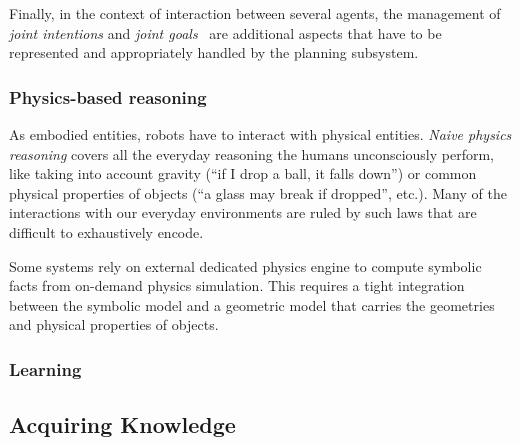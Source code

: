 Finally, in the context of interaction between several agents, the management
of \emph{joint intentions} and \emph{joint goals}~\cite{Tomasello2005,
Dominey2011} are additional aspects that have to be represented and
appropriately handled by the planning subsystem.


\subsubsection{Physics-based reasoning}
\label{sect|physics}

As embodied entities, robots have to interact with physical entities.
\emph{Naive physics reasoning} covers all the everyday reasoning the humans
unconsciously perform, like taking into account gravity (``if I drop a ball, it
falls down'') or common physical properties of objects (``a glass may break if
dropped'', etc.). Many of the interactions with our everyday environments are
ruled by such laws that are difficult to exhaustively encode.

Some systems \cite{Kunze2011a} rely on external dedicated physics engine to
compute symbolic facts from on-demand physics simulation. This requires a tight
integration between the symbolic model and a geometric model that carries the
geometries and physical properties of objects.

\subsubsection{Learning}
\label{sect|learning}


\subsection{Acquiring Knowledge}

\begin{scriptsize}
\begin{center}
\end{center}
\end{scriptsize}

